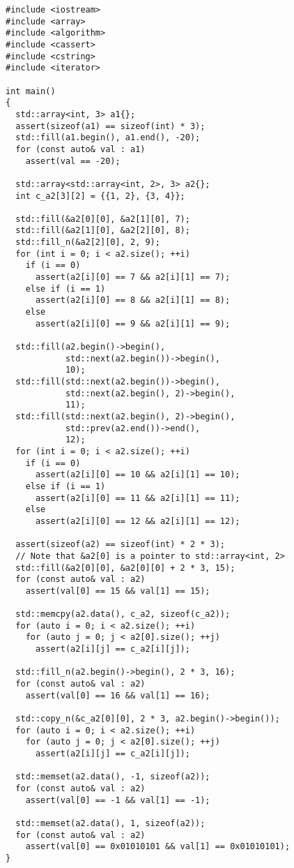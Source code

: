 \documentclass{book}
\begin{document}
	\begin{lstlisting}
#include <iostream>
#include <array>
#include <algorithm>
#include <cassert>
#include <cstring>
#include <iterator>

int main()
{
  std::array<int, 3> a1{};
  assert(sizeof(a1) == sizeof(int) * 3);
  std::fill(a1.begin(), a1.end(), -20);
  for (const auto& val : a1)
    assert(val == -20);

  std::array<std::array<int, 2>, 3> a2{};
  int c_a2[3][2] = {{1, 2}, {3, 4}};

  std::fill(&a2[0][0], &a2[1][0], 7);
  std::fill(&a2[1][0], &a2[2][0], 8);
  std::fill_n(&a2[2][0], 2, 9);
  for (int i = 0; i < a2.size(); ++i)
    if (i == 0)
      assert(a2[i][0] == 7 && a2[i][1] == 7);
    else if (i == 1)
      assert(a2[i][0] == 8 && a2[i][1] == 8);
    else
      assert(a2[i][0] == 9 && a2[i][1] == 9);

  std::fill(a2.begin()->begin(),
            std::next(a2.begin())->begin(),
            10);
  std::fill(std::next(a2.begin())->begin(),
            std::next(a2.begin(), 2)->begin(),
            11);
  std::fill(std::next(a2.begin(), 2)->begin(),
            std::prev(a2.end())->end(),
            12);
  for (int i = 0; i < a2.size(); ++i)
    if (i == 0)
      assert(a2[i][0] == 10 && a2[i][1] == 10);
    else if (i == 1)
      assert(a2[i][0] == 11 && a2[i][1] == 11);
    else
      assert(a2[i][0] == 12 && a2[i][1] == 12);

  assert(sizeof(a2) == sizeof(int) * 2 * 3);
  // Note that &a2[0] is a pointer to std::array<int, 2>
  std::fill(&a2[0][0], &a2[0][0] + 2 * 3, 15);
  for (const auto& val : a2)
    assert(val[0] == 15 && val[1] == 15);

  std::memcpy(a2.data(), c_a2, sizeof(c_a2));
  for (auto i = 0; i < a2.size(); ++i)
    for (auto j = 0; j < a2[0].size(); ++j)
      assert(a2[i][j] == c_a2[i][j]);

  std::fill_n(a2.begin()->begin(), 2 * 3, 16);
  for (const auto& val : a2)
    assert(val[0] == 16 && val[1] == 16);

  std::copy_n(&c_a2[0][0], 2 * 3, a2.begin()->begin());
  for (auto i = 0; i < a2.size(); ++i)
    for (auto j = 0; j < a2[0].size(); ++j)
      assert(a2[i][j] == c_a2[i][j]);

  std::memset(a2.data(), -1, sizeof(a2));
  for (const auto& val : a2)
    assert(val[0] == -1 && val[1] == -1);

  std::memset(a2.data(), 1, sizeof(a2));
  for (const auto& val : a2)
    assert(val[0] == 0x01010101 && val[1] == 0x01010101);
}
	\end{lstlisting}
\end{document}
